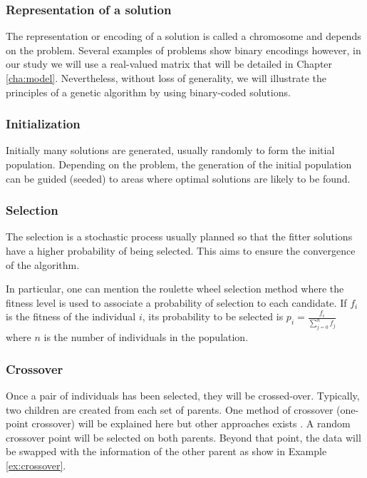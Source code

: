 \subsubsection{Representation of a solution}
The representation or encoding of a solution is called a chromosome and depends on the problem. Several examples of problems show binary encodings however, in our study we will use a real-valued matrix that will be detailed in Chapter \ref{cha:model}. Nevertheless, without loss of generality, we will illustrate the principles of a genetic algorithm by using binary-coded solutions.

\subsubsection{Initialization}
Initially many solutions are generated, usually randomly to form the initial population. Depending on the problem, the generation of the initial population can be guided (seeded) to areas where optimal solutions are likely to be found.

\subsubsection{Selection}
The selection is a stochastic process usually planned so that the fitter solutions have a higher probability of being selected. This aims to ensure the convergence of the algorithm.

In particular, one can mention the roulette wheel selection method where the fitness level is used to associate a probability of selection to each candidate. If $f_i$ is the fitness of the individual $i$, its probability to be selected is $p_i = \frac{f_i}{\sum_{j=0}^{n}f_j}$ where $n$ is the number of individuals in the population.

\subsubsection{Crossover}
Once a pair of individuals has been selected, they will be crossed-over. Typically, two children are created from each set of parents. One method of crossover (one-point crossover) will be explained here but other approaches exists \cite{}. A random crossover point will be selected on both parents. Beyond that point, the data will be swapped with the information of the other parent as show in Example \ref{ex:crossover}.

